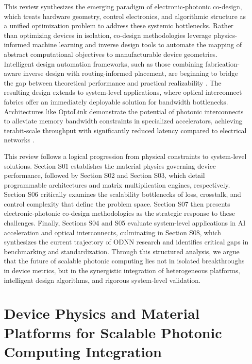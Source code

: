 This review synthesizes the emerging paradigm of electronic-photonic co-design, which treats hardware geometry, control electronics, and algorithmic structure as a unified optimization problem to address these systemic bottlenecks. Rather than optimizing devices in isolation, co-design methodologies leverage physics-informed machine learning and inverse design tools to automate the mapping of abstract computational objectives to manufacturable device geometries. Intelligent design automation frameworks, such as those combining fabrication-aware inverse design with routing-informed placement, are beginning to bridge the gap between theoretical performance and practical realizability \citep{doi_10_1117_12_3066105_d6297c38}. The resulting design extends to system-level applications, where optical interconnect fabrics offer an immediately deployable solution for bandwidth bottlenecks. Architectures like OptoLink demonstrate the potential of photonic interconnects to alleviate memory bandwidth constraints in specialized accelerators, achieving terabit-scale throughput with significantly reduced latency compared to electrical networks \citep{doi_10_1145_3806395_315ab915}.

This review follows a logical progression from physical constraints to system-level solutions. Section S01 establishes the material physics governing device performance, followed by Section S02 and Section S03, which detail programmable architectures and matrix multiplication engines, respectively. Section S06 critically examines the scalability bottlenecks of loss, crosstalk, and control complexity that define the problem space. Section S07 then presents electronic-photonic co-design methodologies as the strategic response to these challenges. Finally, Sections S04 and S05 evaluate system-level applications in AI acceleration and optical interconnects, culminating in Section S08, which synthesizes the current trajectory of ODNN research and identifies critical gaps in benchmarking and standardization. Through this structured analysis, we argue that the future of scalable photonic computing lies not in isolated breakthroughs in device metrics, but in the synergistic integration of heterogeneous platforms, intelligent design algorithms, and rigorous system-level validation.

\section{Device Physics and Material Platforms for Scalable Photonic Computing Integration}\label{device-physics-and-material-platforms-for-scalable-photonic-computing-integration}

